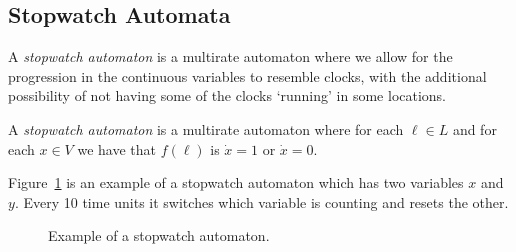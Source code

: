 
\subsection{Stopwatch Automata}
A \emph{stopwatch automaton} is a multirate automaton where we allow for the progression in the continuous variables to resemble clocks, with the additional possibility of not having some of the clocks `running' in some locations.

\begin{defi}
A \emph{stopwatch automaton} is a multirate automaton where for each $\ell\in L$ and for each $x\in V$ we have that $f(\ell)$ is $\dot{x}=1$ or $\dot{x}=0$.
\end{defi}

\begin{ex}
Figure~\ref{fig:exsw} is an example of a stopwatch automaton which has two variables $x$ and $y$. Every 10 time units it switches which variable is counting and resets the other.

    \begin{figure}[H]
        \begin{center}
            \caption{Example of a stopwatch automaton.}
            \label{fig:exsw}
        \end{center}
    \end{figure}
    \end{ex}
